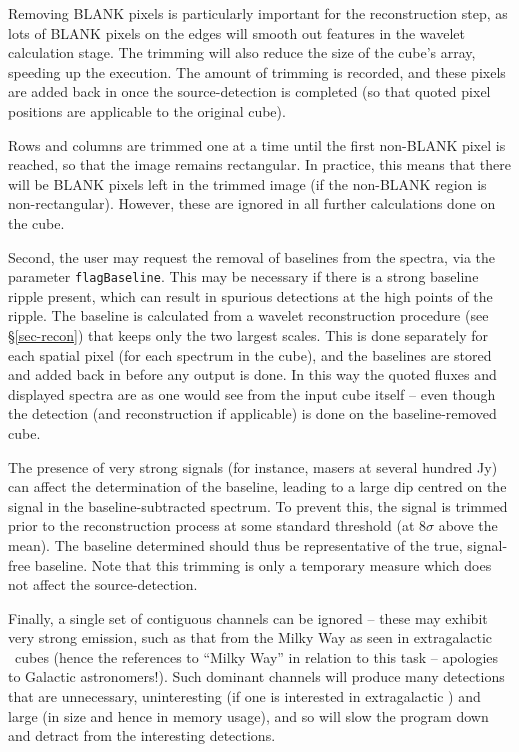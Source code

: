 Removing BLANK pixels is particularly important for the reconstruction
step, as lots of BLANK pixels on the edges will smooth out features in
the wavelet calculation stage. The trimming will also reduce the size
of the cube's array, speeding up the execution. The amount of trimming
is recorded, and these pixels are added back in once the
source-detection is completed (so that quoted pixel positions are
applicable to the original cube).

Rows and columns are trimmed one at a time until the first non-BLANK
pixel is reached, so that the image remains rectangular. In practice,
this means that there will be BLANK pixels left in the trimmed image
(if the non-BLANK region is non-rectangular). However, these are
ignored in all further calculations done on the cube.


Second, the user may request the removal of baselines from the
spectra, via the parameter \texttt{flagBaseline}. This may be
necessary if there is a strong baseline ripple present, which can
result in spurious detections at the high points of the ripple. The
baseline is calculated from a wavelet reconstruction procedure (see
\S\ref{sec-recon}) that keeps only the two largest scales. This is
done separately for each spatial pixel (\ie for each spectrum in the
cube), and the baselines are stored and added back in before any
output is done. In this way the quoted fluxes and displayed spectra
are as one would see from the input cube itself -- even though the
detection (and reconstruction if applicable) is done on the
baseline-removed cube.

The presence of very strong signals (for instance, masers at several
hundred Jy) can affect the determination of the baseline, leading to a
large dip centred on the signal in the baseline-subtracted
spectrum. To prevent this, the signal is trimmed prior to the
reconstruction process at some standard threshold (at $8\sigma$ above
the mean). The baseline determined should thus be representative of
the true, signal-free baseline. Note that this trimming is only a
temporary measure which does not affect the source-detection.


Finally, a single set of contiguous channels can be ignored -- these
may exhibit very strong emission, such as that from the Milky Way as
seen in extragalactic \hi\ cubes (hence the references to ``Milky
Way'' in relation to this task -- apologies to Galactic
astronomers!). Such dominant channels will produce many detections
that are unnecessary, uninteresting (if one is interested in
extragalactic \hi) and large (in size and hence in memory usage), and
so will slow the program down and detract from the interesting
detections. 

